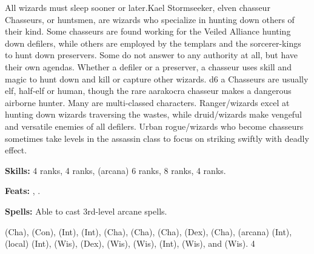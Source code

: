 {All wizards must sleep sooner or later.}{Kael Stormseeker, elven chasseur}
{
Chasseurs, or huntsmen, are wizards who specialize in hunting down others of their kind. Some chasseurs are found working for the Veiled Alliance hunting down defilers, while others are employed by the templars and the sorcerer-kings to hunt down preservers. Some do not answer to any authority at all, but have their own agendas. Whether a defiler or a preserver, a chasseur uses skill and magic to hunt down and kill or capture other wizards.
}
{d6}
{a}
{
Chasseurs are usually elf, half-elf or human, though the rare aarakocra chasseur makes a dangerous airborne hunter. Many are multi-classed characters. Ranger/wizards excel at hunting down wizards traversing the wastes, while druid/wizards make vengeful and versatile enemies of all defilers. Urban rogue/wizards who become chasseurs sometimes take levels in the assassin class to focus on striking swiftly with deadly effect.
}
{
\textbf{Skills:}  4 ranks,  4 ranks,  (arcana) 6 ranks,  8 ranks,  4 ranks.

\textbf{Feats:} , .

\textbf{Spells:} Able to cast 3rd-level arcane spells.
}
{ (Cha),  (Con),  (Int),  (Int),  (Cha),  (Cha),  (Cha),  (Dex),  (Cha),  (arcana) (Int),  (local) (Int),  (Wis),  (Dex),  (Wis),  (Wis),  (Int),  (Wis), and  (Wis).}
{4}
{}{}
